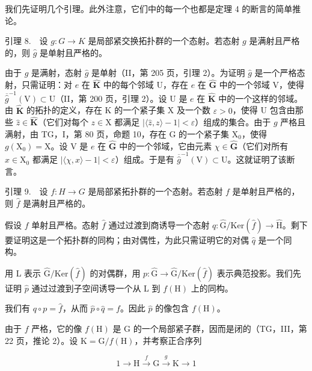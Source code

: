 我们先证明几个引理。此外注意，它们中的每一个也都是定理 4 的断言的简单推论。

引理 8.　设 \(g \colon G \to K\) 是局部紧交换拓扑群的一个态射。若态射 \(g\) 是满射且严格的，则 \(\widehat{g}\) 是单射且严格的。

由于 \(g\) 是满射，态射 \(\widehat{g}\) 是单射（II，第 205 页，引理 2）。为证明 \(\widehat{g}\) 是一个严格态射，只需证明：对 \(e\) 在 \(\widehat{\mathbf{K}}\) 中的每个邻域 U，存在 \(e\) 在 \(\widehat{\mathbf{G}}\) 中的一个邻域 V，使得 \(\overline{\widehat{g}}^{-1} (\mathrm{V})\subset \mathrm{U}\)（II，第 200 页，引理 2）。设 U 是 \(e\) 在 \(\widehat{\mathbf{K}}\) 中的一个这样的邻域。由 \(\widehat{\mathbf{K}}\) 的拓扑的定义，存在 K 的一个紧子集 X 及一个数 \(\varepsilon >0\)，使得 U 包含由那些 \(\widehat{z}\in \widehat{\mathbf{K}}\)（它们对每个 \(z\in \mathrm{X}\) 都满足 \(|\langle \widehat{z},z\rangle -1| < \varepsilon\)）组成的集合。由于 \(g\) 严格且满射，由 TG，I，第 80 页，命题 10，存在 G 的一个紧子集 \(\mathrm{X}_0\)，使得 \(g(\mathrm{X}_0) = \mathrm{X}\)。设 V 是 \(e\) 在 \(\widehat{\mathbf{G}}\) 中的一个邻域，它由元素 \(\chi \in \widehat{\mathbf{G}}\)（它们对所有 \(x\in \mathrm{X}_0\) 都满足 \(|\langle \chi ,x\rangle -1| < \varepsilon\)）组成。于是有 \(\overline{\widehat{g}}^{-1} (\mathrm{V})\subset \mathrm{U}\)。这就证明了该断言。

引理 9.　设 \(f\colon H\to G\) 是局部紧拓扑群的一个态射。若态射 \(f\) 是单射且严格的，则 \(\widehat{f}\) 是满射且严格的。

假设 \(f\) 单射且严格。态射 \(\widehat{f}\) 通过过渡到商诱导一个态射 \(q \colon \widehat{\mathrm{G}} / \mathrm{Ker}(\widehat{f}) \to \widehat{\mathrm{H}}\)。剩下要证明这是一个拓扑群的同构；由对偶性，为此只需证明它的对偶 \(\widehat{q}\) 是一个同构。

用 L 表示 \(\widehat{\mathrm{G}}/\mathrm{Ker}(\widehat{f})\) 的对偶群，用 \(p\colon\widehat{\mathrm{G}}\to\widehat{\mathrm{G}}/\mathrm{Ker}(\widehat{f})\) 表示典范投影。我们先证明 \(\widehat{p}\) 通过过渡到子空间诱导一个从 L 到 \(f(\mathrm{H})\) 上的同构。

我们有 \(q \circ p = \widehat{f}\)，从而 \(\widehat{p} \circ \widehat{q} = f\)。因此 \(\widehat{p}\) 的像包含 \(f(\mathrm{H})\)。

由于 \(f\) 严格，它的像 \(f(\mathrm{H})\) 是 \(\mathrm{G}\) 的一个局部紧子群，因而是闭的（TG，III，第 22 页，推论 2）。设 \(\mathrm{K} = \mathrm{G}/f(\mathrm{H})\)，并考察正合序列

\[
1 \to \mathrm{H} \xrightarrow {f} \mathrm{G} \xrightarrow {g} \mathrm{K} \to 1
\]

